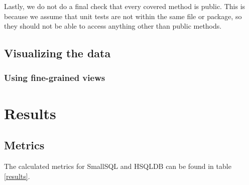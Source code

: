 \documentclass{article}
\begin{document}
Lastly, we do not do a final check that every covered method is public. This is because we assume that unit tests are not within the same file or package, so they should not be able to access anything other than public methods.

\subsection{Visualizing the data}
\subsubsection{Using fine-grained views}

\section{Results}

\subsection{Metrics}
The calculated metrics for SmallSQL and HSQLDB can be found in table \ref{results}.
\end{document}

